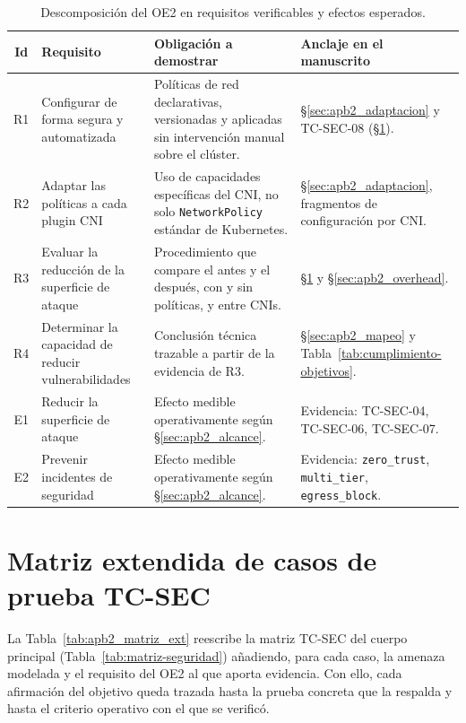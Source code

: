\begin{table}[htbp]
\centering
\scriptsize
\caption{Descomposición del OE2 en requisitos verificables y efectos esperados.}
\label{tab:apb2_verbos}
\begin{tabularx}{\textwidth}{|c|l|Y|Y|}
\hline
\textbf{Id} & \textbf{Requisito} & \textbf{Obligación a demostrar} & \textbf{Anclaje en el manuscrito} \\
\hline
R1 & Configurar de forma segura y automatizada & Políticas de red declarativas, versionadas y aplicadas sin intervención manual sobre el clúster. & \S\ref{sec:apb2_adaptacion} y TC-SEC-08 (\S\ref{sec:apb2_matriz}). \\
\hline
R2 & Adaptar las políticas a cada plugin CNI & Uso de capacidades específicas del CNI, no solo \texttt{NetworkPolicy} estándar de Kubernetes. & \S\ref{sec:apb2_adaptacion}, fragmentos de configuración por CNI. \\
\hline
R3 & Evaluar la reducción de la superficie de ataque & Procedimiento que compare el antes y el después, con y sin políticas, y entre CNIs. & \S\ref{sec:apb2_matriz} y \S\ref{sec:apb2_overhead}. \\
\hline
R4 & Determinar la capacidad de reducir vulnerabilidades & Conclusión técnica trazable a partir de la evidencia de R3. & \S\ref{sec:apb2_mapeo} y Tabla~\ref{tab:cumplimiento-objetivos}. \\
\hline
E1 & Reducir la superficie de ataque & Efecto medible operativamente según \S\ref{sec:apb2_alcance}. & Evidencia: TC-SEC-04, TC-SEC-06, TC-SEC-07. \\
\hline
E2 & Prevenir incidentes de seguridad & Efecto medible operativamente según \S\ref{sec:apb2_alcance}. & Evidencia: \texttt{zero\_trust}, \texttt{multi\_tier}, \texttt{egress\_block}. \\
\hline
\end{tabularx}
\end{table}

\section{Matriz extendida de casos de prueba TC-SEC} \label{sec:apb2_matriz}

La Tabla~\ref{tab:apb2_matriz_ext} reescribe la matriz TC-SEC del cuerpo principal (Tabla~\ref{tab:matriz-seguridad}) añadiendo, para cada caso, la amenaza modelada y el requisito del OE2 al que aporta evidencia. Con ello, cada afirmación del objetivo queda trazada hasta la prueba concreta que la respalda y hasta el criterio operativo con el que se verificó.

